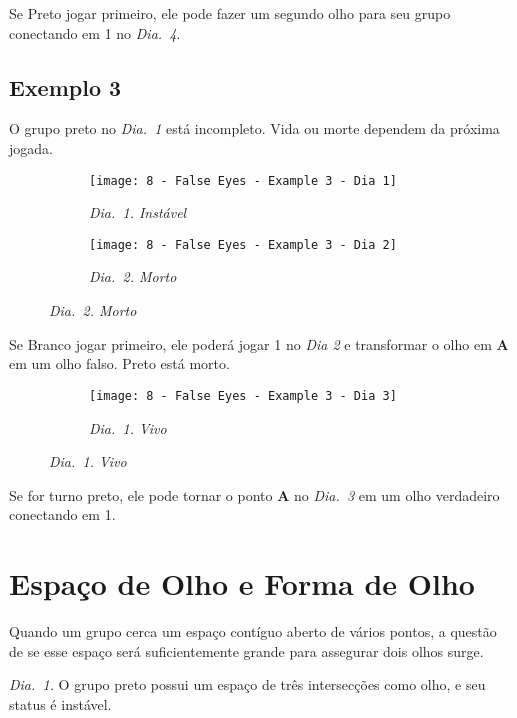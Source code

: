 Se Preto jogar primeiro, ele pode fazer um segundo olho para seu grupo conectando em 1 no \emph{Dia.\@~4}.

\subsection{Exemplo 3}

O grupo preto no \emph{Dia.\@~1} está incompleto. Vida ou morte dependem da próxima jogada.

\begin{figure}[h!]
    \centering
    \begin{subfigure}[t]{.31\textwidth}
        \texttt{[image: 8 - False Eyes - Example 3 - Dia 1]}
        \caption*{\emph{Dia.\@~1. Instável}}
    \end{subfigure}
    \hspace{1cm}
    \begin{subfigure}[t]{.31\textwidth}
        \texttt{[image: 8 - False Eyes - Example 3 - Dia 2]}
        \caption*{\emph{Dia.\@~2. Morto}}
    \end{subfigure}
\end{figure}

Se Branco jogar primeiro, ele poderá jogar 1 no \emph{Dia 2} e transformar o olho em \textbf{A} em um olho falso. Preto está morto.

\begin{figure}[h!]
    \centering
    \begin{subfigure}[t]{.31\textwidth}
        \texttt{[image: 8 - False Eyes - Example 3 - Dia 3]}
        \caption*{\emph{Dia.\@~1. Vivo}}
    \end{subfigure}
\end{figure}

Se for turno preto, ele pode tornar o ponto \textbf{A} no \emph{Dia.\@~3} em um olho verdadeiro conectando em 1. 

\pagebreak

\section{Espaço de Olho e Forma de Olho}

Quando um grupo cerca um espaço contíguo aberto de vários pontos, a questão de se esse espaço será suficientemente grande para assegurar dois olhos surge.

\emph{Dia.\@~1.} O grupo preto possui um espaço de três intersecções como olho, e seu status é instável.

